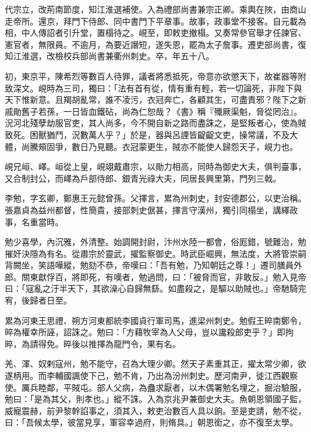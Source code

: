 \begin{pinyinscope}
 代宗立，改荊南節度，知江淮選補使。入為禮部尚書兼宗正卿。乘輿在陜，由商山走帝所。還京，拜門下侍郎、同中書門下平章事。故事，政事堂不接客。自元載為相，中人傳詔者引升堂，置榻待之。峴至，即敕吏撤榻。又奏常參官舉才任諫官、憲官者，無限員。不逾月，為要近譖短，遂失恩，罷為太子詹事。遷吏部尚書，復知江淮選，改檢校兵部尚書兼衢州刺史。卒，年五十八。



 初，東京平，陳希烈等數百人待罪，議者將悉抵死，帝意亦欲懲天下，故崔器等附致深文。峴時為三司，獨曰：「法有首有從，情有重有輕，若一切論死，非陛下與天下惟新意。且羯胡亂常，誰不凌污，衣冠奔亡，各顧其生，可盡責邪？陛下之新戚勛舊子若孫，一日皆血鐵砧，尚為仁恕哉？《書》稱『殲厥渠魁，脅從罔治』。況河北殘孽劫服官吏，其人尚多，今不開自新之路而盡誅之，是堅叛者心，使為賊致死。困獸猶鬥，況數萬人乎？」於是，器與呂諲皆齪齪文吏，操常議，不及大體，尚騰頰固爭，數日乃見聽。衣冠蒙更生，賊亦不能使人歸怨天子，峴力也。



 峴兄峘、嶧。峘從上皇，峴翊戴肅宗，以勛力相高，同時為御史大夫，俱判臺事，又合制封公，而嶧為戶部侍郎、銀青光祿大夫，同居長興里第，門列三戟。



 李勉，字玄卿，鄭惠王元懿曾孫。父擇言，累為州刺史，封安德郡公，以吏治稱。張嘉貞為益州都督，性簡貴，接部刺史倨甚，擇言守漢州，獨引同榻坐，講繹政事，名重當時。



 勉少喜學，內沉雅，外清整。始調開封尉，汴州水陸一都會，俗厖錯，號難治，勉摧奸決隱為有名。從肅宗於靈武，擢監察御史。時武臣崛興，無法度，大將管崇嗣背闕坐，笑語嘩縱，勉劾不恭，帝嘆曰：「吾有勉，乃知朝廷之尊！」遷司膳員外郎。關東獻俘百，將即死，有嘆者，勉過問，曰：「被脅而官，非敢反。」勉入見帝曰：「寇亂之汙半天下，其欲澡心自歸無繇。如盡殺之，是驅以助賊也。」帝馳騎完宥，後歸者日至。



 累為河東王思禮、朔方河東都統李國貞行軍司馬，進梁州刺史。勉假王晬南鄭令，晬為權幸所誣，詔誅之。勉曰：「方藉牧宰為人父母，豈以讒殺郎吏乎？」即拘晬，為請得免。晬後以推擇為龍門令，果有名。



 羌、渾、奴剌寇州，勉不能守，召為大理少卿。然天子素重其正，擢太常少卿，欲遂柄用。而李輔國諷使下己，勉不肯，乃出為汾州刺史。歷河南尹，徙江西觀察使。厲兵睦鄰，平賊屯。部人父病，為蠱求厭者，以木偶署勉名埋之，掘治驗服，勉曰：「是為其父，則孝也。」縱不誅。入為京兆尹兼御史大夫。魚朝恩領國子監，威寵震赫，前尹黎幹諂事之，須其入，敕吏治數百人具以餉。至是吏請，勉不從，曰：「吾候太學，彼當見享，軍容幸過府，則脩具。」朝恩銜之，亦不復至太學。




\end{pinyinscope}
